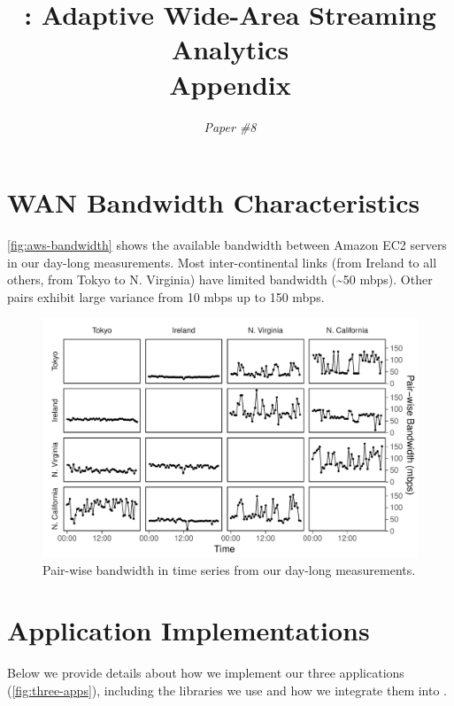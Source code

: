 \documentclass[twocolumn, 9pt]{article}
\begin{document}
\title{\sysname{}: Adaptive Wide-Area Streaming Analytics \\ Appendix}
\author{ \textit{Paper \#8} }
\date{}
\maketitle

\section{WAN Bandwidth Characteristics}

\autoref{fig:aws-bandwidth} shows the available bandwidth between Amazon EC2
servers in our day-long measurements. Most inter-continental links (from Ireland
to all others, from Tokyo to N. Virginia) have limited bandwidth
(\textasciitilde 50 mbps). Other pairs exhibit large variance from 10 mbps up to
150 mbps.

\begin{figure}
  \centering
  \includegraphics[width=1\columnwidth]{figures/aws-bandwidth.pdf}
  \caption{Pair-wise bandwidth in time series from our day-long measurements.}
  \label{fig:aws-bandwidth}
\end{figure}

\section{Application Implementations}
\label{appendix:appl-impl}

Below we provide details about how we implement our three applications
(\autoref{fig:three-apps}), including the libraries we use and how we integrate
them into \sysname{}.
\end{document}
